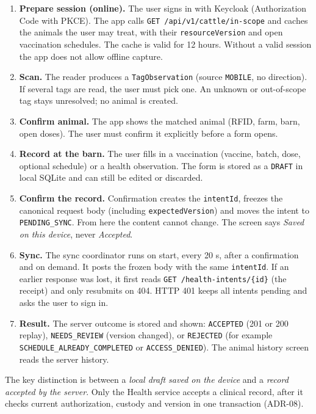 \begin{enumerate}
\item \textbf{Prepare session (online).} The user signs in with
Keycloak (Authorization Code with PKCE). The app calls
\texttt{GET /api/v1/cattle/in-scope} and caches the animals the user
may treat, with their \texttt{resourceVersion} and open vaccination
schedules. The cache is valid for 12 hours. Without a valid session
the app does not allow offline capture.
\item \textbf{Scan.} The reader produces a \texttt{TagObservation}
(source \texttt{MOBILE}, no direction). If several tags are read, the
user must pick one. An unknown or out-of-scope tag stays unresolved;
no animal is created.
\item \textbf{Confirm animal.} The app shows the matched animal (RFID,
farm, barn, open doses). The user must confirm it explicitly before a
form opens.
\item \textbf{Record at the barn.} The user fills in a vaccination
(vaccine, batch, dose, optional schedule) or a health observation. The
form is stored as a \texttt{DRAFT} in local SQLite and can still be
edited or discarded.
\item \textbf{Confirm the record.} Confirmation creates the
\texttt{intentId}, freezes the canonical request body (including
\texttt{expectedVersion}) and moves the intent to
\texttt{PENDING\_SYNC}. From here the content cannot change. The
screen says \emph{Saved on this device}, never \emph{Accepted}.
\item \textbf{Sync.} The sync coordinator runs on start, every 20 s,
after a confirmation and on demand. It posts the frozen body with the
same \texttt{intentId}. If an earlier response was lost, it first reads
\texttt{GET /health-intents/\{id\}} (the receipt) and only resubmits on
404. HTTP 401 keeps all intents pending and asks the user to sign in.
\item \textbf{Result.} The server outcome is stored and shown:
\texttt{ACCEPTED} (201 or 200 replay), \texttt{NEEDS\_REVIEW} (version
changed), or \texttt{REJECTED} (for example
\texttt{SCHEDULE\_ALREADY\_COMPLETED} or \texttt{ACCESS\_DENIED}). The
animal history screen reads the server history.
\end{enumerate}

The key distinction is between a \emph{local draft saved on the
device} and a \emph{record accepted by the server}. Only the Health
service accepts a clinical record, after it checks current
authorization, custody and version in one transaction (ADR-08).

